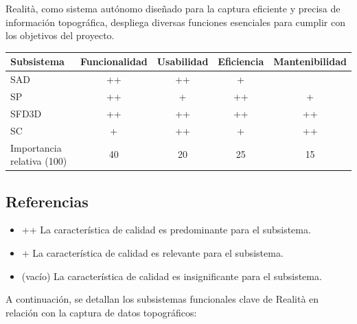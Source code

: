 \documentclass[12pt,a4paper, twoside]{article} %
\begin{document}
Realità, como sistema autónomo diseñado para la captura eficiente y precisa de información topográfica, despliega diversas funciones esenciales para cumplir con los objetivos del proyecto.


\begin{table}[h]
\centering
\begin{tabular}{|l|c|c|c|c|}
    \hline
    Subsistema & Funcionalidad  & Usabilidad & Eficiencia & Mantenibilidad \\
    \hline
    SAD & ++ & ++ & + &  \\
    SP & ++ & + & ++ & + \\
    SFD3D & ++ & ++ & ++ & ++ \\
    SC & + & ++ & + & ++\\
    \hline
    Importancia relativa (100) & 40 & 20 & 25 & 15\\
    \hline
\end{tabular}
\end{table}

\subsection*{Referencias}

\begin{itemize}
    \item ++ La característica de calidad es predominante para el subsistema.
    \item + La característica de calidad es relevante para el subsistema.
    \item (vacío) La característica de calidad es insignificante para el subsistema.
\end{itemize}


A continuación, se detallan los subsistemas funcionales clave de Realità en relación con la captura de datos topográficos:
\end{document}

